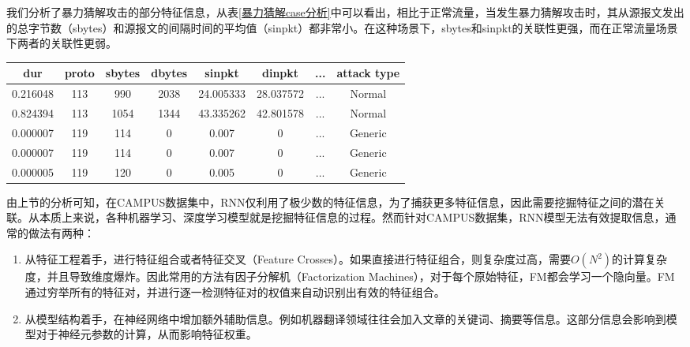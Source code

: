 
我们分析了暴力猜解攻击的部分特征信息，从表\ref{暴力猜解case分析}中可以看出，相比于正常流量，当发生暴力猜解攻击时，其从源报文发出的总字节数（sbytes）和源报文的间隔时间的平均值（sinpkt）都非常小。在这种场景下，sbytes和sinpkt的关联性更强，而在正常流量场景下两者的关联性更弱。

\begin{table*}[h]
  \small
  \caption{暴力猜解case分析}
  \label{暴力猜解case分析}
  \centering
  \begin{tabular}{cccccccc}
  \toprule
  dur & proto & sbytes & dbytes & sinpkt & dinpkt & ... & attack type \\
  \midrule
  0.216048 &	113	&990	&2038	&24.005333	&28.037572 & ... & Normal\\
  0.824394	&113	&1054	&1344	&43.335262	&42.801578 & ... & Normal\\
  0.000007	&119	&114	&0	&0.007	&0 & ... & Generic\\
  0.000007	&119	&114	&0	&0.007	&0 & ... & Generic\\
  0.000005	&119	&120	&0	&0.005	&0 & ... & Generic\\
  
   \bottomrule
  
  \end{tabular}
  \end{table*}
  

由上节的分析可知，在CAMPUS数据集中，RNN仅利用了极少数的特征信息，为了捕获更多特征信息，因此需要挖掘特征之间的潜在关联。从本质上来说，各种机器学习、深度学习模型就是挖掘特征信息的过程。然而针对CAMPUS数据集，RNN模型无法有效提取信息，通常的做法有两种：
\begin{enumerate}
  \item 从特征工程着手，进行特征组合或者特征交叉（Feature Crosses）。如果直接进行特征组合，则复杂度过高，需要$O(N^2)$的计算复杂度，并且导致维度爆炸。因此常用的方法有因子分解机（Factorization Machines），对于每个原始特征，FM都会学习一个隐向量。FM通过穷举所有的特征对，并进行逐一检测特征对的权值来自动识别出有效的特征组合。
  \item 从模型结构着手，在神经网络中增加额外辅助信息。例如机器翻译领域往往会加入文章的关键词、摘要等信息。这部分信息会影响到模型对于神经元参数的计算，从而影响特征权重。
\end{enumerate}

